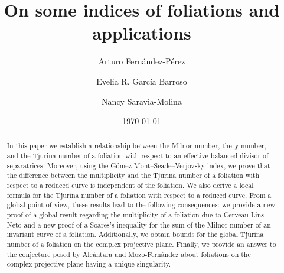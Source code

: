 \documentclass[11pt]{amsart}
\title[On some indices of foliations and applications]{On some indices of foliations and applications}
\date{\today}
\author[A. Fern\'andez-P\'erez]{Arturo Fern\'andez-P\'erez}
\author[E. R.  Garc\'{i}a Barroso]{Evelia R. Garc\'{i}a Barroso}
\author[N. Saravia-Molina]{Nancy Saravia-Molina}
\begin{document}

\begin{abstract}
In this paper we establish a relationship between the Milnor number, the $\chi$-number, and the Tjurina number of a foliation with respect to an effective balanced divisor of separatrices. Moreover, using the G\'omez-Mont--Seade--Verjovsky index, we prove that the difference between the multiplicity and the Tjurina number of a foliation with respect to a reduced curve is independent of the foliation. We also derive a local formula for the Tjurina number of a foliation with respect to a reduced curve. From a global point of view, these results lead to the following consequences: we provide a new proof of a global result regarding the multiplicity of a foliation due to Cerveau-Lins Neto and a new proof of a Soares's inequality for the sum of the Milnor number of an invariant curve of a foliation. Additionally, we obtain bounds for the global Tjurina number of a foliation on the complex projective plane. Finally, we provide an answer to the conjecture posed by Alc\'antara and Mozo-Fern\'andez about foliations on the complex projective plane having a unique singularity.  
\end{abstract}
\maketitle

\end{document}

